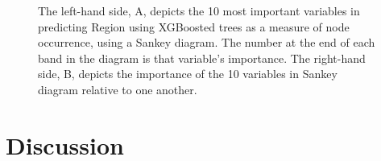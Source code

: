 \documentclass[review,12pt,authoryear]{elsarticle}
\begin{document}
\begin{linenumbers}
\begin{figure}[htb]
  \caption{The left-hand side, A,  depicts the 10 most important variables in predicting Region using XGBoosted trees as a measure of node occurrence, using a Sankey diagram. The number at the end of each band in the diagram is that variable's importance. The right-hand side, B, depicts the importance of the 10 variables in Sankey diagram relative to one another.}\label{fig:region_sankey}
 \end{figure}
\section{Discussion}


\end{linenumbers}
\end{document}
